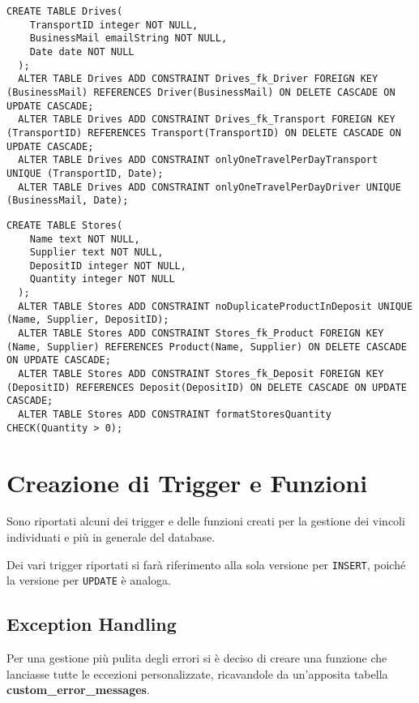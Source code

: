 \begin{lstlisting}[caption={Creazione della tabella \textbf{Drives}}]
  CREATE TABLE Drives(
    TransportID integer NOT NULL,
    BusinessMail emailString NOT NULL,
    Date date NOT NULL
  );
  ALTER TABLE Drives ADD CONSTRAINT Drives_fk_Driver FOREIGN KEY (BusinessMail) REFERENCES Driver(BusinessMail) ON DELETE CASCADE ON UPDATE CASCADE;
  ALTER TABLE Drives ADD CONSTRAINT Drives_fk_Transport FOREIGN KEY (TransportID) REFERENCES Transport(TransportID) ON DELETE CASCADE ON UPDATE CASCADE;
  ALTER TABLE Drives ADD CONSTRAINT onlyOneTravelPerDayTransport UNIQUE (TransportID, Date);
  ALTER TABLE Drives ADD CONSTRAINT onlyOneTravelPerDayDriver UNIQUE (BusinessMail, Date);
\end{lstlisting}

\begin{lstlisting}[caption={Creazione della tabella \textbf{Stores}}]
  CREATE TABLE Stores(
    Name text NOT NULL,
    Supplier text NOT NULL,
    DepositID integer NOT NULL,
    Quantity integer NOT NULL
  );
  ALTER TABLE Stores ADD CONSTRAINT noDuplicateProductInDeposit UNIQUE (Name, Supplier, DepositID);
  ALTER TABLE Stores ADD CONSTRAINT Stores_fk_Product FOREIGN KEY (Name, Supplier) REFERENCES Product(Name, Supplier) ON DELETE CASCADE ON UPDATE CASCADE;
  ALTER TABLE Stores ADD CONSTRAINT Stores_fk_Deposit FOREIGN KEY (DepositID) REFERENCES Deposit(DepositID) ON DELETE CASCADE ON UPDATE CASCADE;
  ALTER TABLE Stores ADD CONSTRAINT formatStoresQuantity CHECK(Quantity > 0);
\end{lstlisting}

\section{Creazione di Trigger e Funzioni}

Sono riportati alcuni dei trigger e delle funzioni creati per la gestione dei vincoli individuati e più in generale del database.

Dei vari trigger riportati si farà riferimento alla sola versione per \lstinline{INSERT}, poiché la versione per \lstinline{UPDATE} è analoga.

\subsection{Exception Handling}

Per una gestione più pulita degli errori si è deciso di creare una funzione che lanciasse tutte le eccezioni personalizzate, ricavandole da un'apposita tabella \textbf{custom\_error\_messages}.

